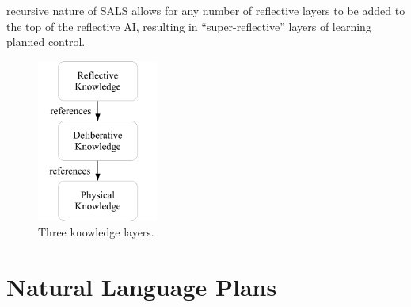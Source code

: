 recursive nature of SALS allows for any number of reflective layers to
be added to the top of the reflective AI, resulting in
``super-reflective'' layers of learning planned control.
\begin{figure}
  \center
  \includegraphics[width=4cm]{gfx/three_knowledge_layers}
  \caption{Three knowledge layers.}
  \label{figure:three_knowledge_layers}
\end{figure}

\section{Natural Language Plans}

